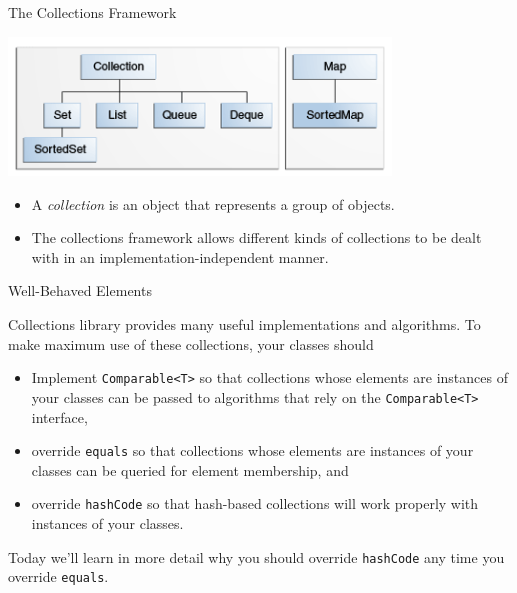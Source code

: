 \documentclass{beamer}
\begin{document}
\begin{frame}
  \titlepage
\end{frame}


\begin{frame}[fragile]{The Collections Framework}

\begin{center}
\includegraphics[width=4in]{colls-coreInterfaces.png}
\end{center}

\begin{itemize}
\item A {\it collection} is an object that represents a group of objects.
\item The collections framework allows different kinds of collections to be dealt with in an implementation-independent manner.
\end{itemize}


\end{frame}

\begin{frame}[fragile]{Well-Behaved Elements}

Collections library provides many useful implementations and algorithms.  To make maximum use of these collections, your classes should
\begin{itemize}
\item Implement {\tt Comparable<T>} so that collections whose elements are instances of your classes can be passed to algorithms that rely on the {\tt Comparable<T>} interface,
\item override {\tt equals} so that collections whose elements are instances of your classes can be queried for element membership, and
\item override {\tt hashCode} so that hash-based collections will work properly with instances of your classes.
\end{itemize}

Today we'll learn in more detail why you should override {\tt hashCode} any time you override {\tt equals}.

\end{frame}
\end{document}
